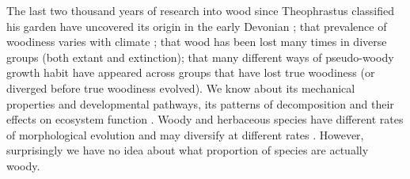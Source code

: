 \documentclass[12pt]{article}
\begin{document}
The last two thousand years of research into wood since Theophrastus
classified his garden have uncovered its origin in the early Devonian
\citep[$\sim$~400 mya;][]{gerrienne2011simple}; that prevalence of
woodiness varies with climate \citep{judd1994}; that wood has been
lost many times in diverse groups (both extant and extinction); that
many different ways of pseudo-woody growth habit have appeared across
groups that have lost true woodiness (or diverged before true
woodiness evolved).  We know about its mechanical properties and
developmental pathways, its patterns of decomposition and their
effects on ecosystem function \citep{Cornwellwood}.  Woody and
herbaceous species have different rates of morphological evolution and
may diversify at different rates \citep{SmithDonoghue}.
%
However, surprisingly we have no idea about what proportion of species
are actually woody.


%
\end{document}
